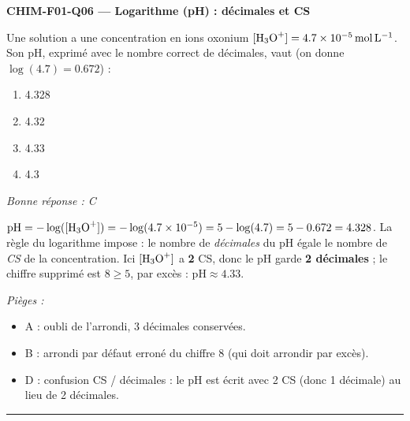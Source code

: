 \documentclass[11pt,a4paper]{article}
\begin{document}
\noindent\textbf{CHIM-F01-Q06 --- Logarithme (pH) : décimales et CS}\par
Une solution a une concentration en ions oxonium $[\ce{H3O+}] = \qty{4.7e-5}{\mol\per\litre}$. Son pH, exprimé avec le nombre correct de décimales, vaut (on donne $\log(\num{4.7}) = \num{0.672}$) :
\begin{enumerate}[label=\Alph*)]
\item \num{4.328}
\item \num{4.32}
\item \num{4.33}
\item \num{4.3}
\end{enumerate}
\textit{Bonne réponse : C}\par
$\mathrm{pH} = -\log([\ce{H3O+}]) = -\log(\num{4.7e-5}) = 5 - \log(\num{4.7}) = 5 - \num{0.672} = \num{4.328}$. La règle du logarithme impose : le nombre de \emph{décimales} du pH égale le nombre de \emph{CS} de la concentration. Ici $[\ce{H3O+}]$ a \textbf{2} CS, donc le pH garde \textbf{2 décimales} ; le chiffre supprimé est $8 \ge 5$, par excès : $\mathrm{pH} \approx \num{4.33}$.\par
\textit{Pièges :}
\begin{itemize}
\item A : oubli de l'arrondi, 3 décimales conservées.
\item B : arrondi par défaut erroné du chiffre $8$ (qui doit arrondir par excès).
\item D : confusion CS / décimales : le pH est écrit avec 2 CS (donc 1 décimale) au lieu de 2 décimales.
\end{itemize}
\vspace{6pt}\hrule\vspace{8pt}
\end{document}

